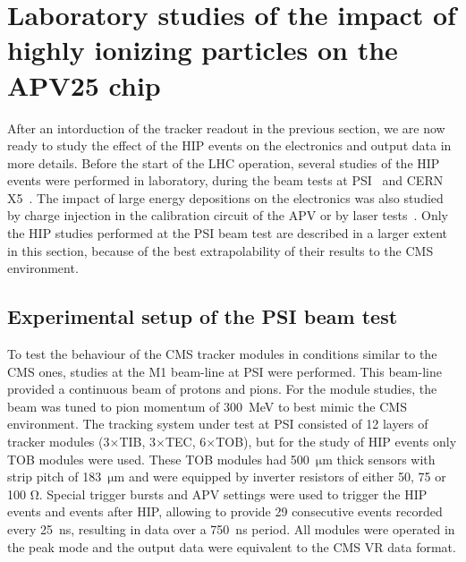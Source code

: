 
\newpage

\section{Laboratory studies of the impact of highly ionizing particles on the APV25 chip~\label{sec:HIPinPast}}


After an intorduction of the tracker readout in the previous section, we are now ready to study the effect of the HIP events on the electronics and output data in more details. Before the start of the LHC operation, several studies of the HIP events were performed in laboratory, during the beam tests at PSI~\cite{Tomalin:2003aaa} and CERN X5~\cite{Bainbridge:2002bda}. The impact of large energy depositions on the electronics was also studied by charge injection in the calibration circuit of the APV or by laser tests~\cite{Adam:2005pz}. Only the HIP studies performed at the PSI beam test are described in a larger extent in this section, because of the best extrapolability of their results to the CMS environment.

\subsection{Experimental setup of the PSI beam test}

To test the behaviour of the CMS tracker modules in conditions similar to the CMS ones, studies at the M1 beam-line at PSI were performed. This beam-line provided a continuous beam of protons and pions. For the module studies, the beam was tuned to pion momentum of 300~MeV to best mimic the CMS environment. The tracking system under test at PSI consisted of 12 layers of tracker modules (3$\times$TIB, 3$\times$TEC, 6$\times$TOB), but for the study of HIP events only TOB modules were used. These TOB modules had 500~$\mathrm{\mu m}$ thick sensors with strip pitch of 183~$\mathrm{\mu}$m and were equipped by inverter resistors of either 50, 75 or 100 $\mathrm{\Omega}$. Special trigger bursts and APV settings were used to trigger the HIP events and events after HIP, allowing to provide 29 consecutive events recorded every 25~ns, resulting in data over a 750~ns period. All modules were operated in the peak mode and the output data were equivalent to the CMS VR data format. 


